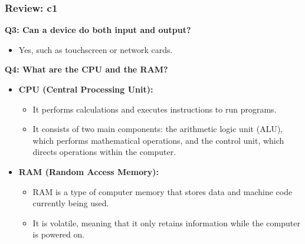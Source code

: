 \documentclass[
	11pt, %
]{beamer}
\begin{document}

\begin{frame}
	\frametitle{Review: c1}

	\textbf{Q3: Can a device do both input and output?}

	\begin{itemize}
	    \item Yes, such as touchscreen or network cards.
	\end{itemize}

	\vspace{0.5cm}

	\textbf{Q4: What are the CPU and the RAM?}

	\begin{itemize}
	    \item \textbf{CPU (Central Processing Unit):}
	    \begin{itemize}
	        \item It performs calculations and executes instructions to run programs.
	        \item It consists of two main components: the arithmetic logic unit (ALU), which performs mathematical operations, and the control unit, which directs operations within the computer.
	    \end{itemize}
	    
	    \item \textbf{RAM (Random Access Memory):}
	    \begin{itemize}
	        \item RAM is a type of computer memory that stores data and machine code currently being used.
	        \item It is volatile, meaning that it only retains information while the computer is powered on.
	    \end{itemize}
	\end{itemize}

\end{frame}

\end{document}
